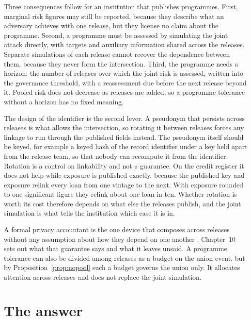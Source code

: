 Three consequences follow for an institution that publishes programmes. First,
marginal risk figures may still be reported, because they describe what an
adversary achieves with one release, but they license no claim about the programme.
Second, a programme must be assessed by simulating the joint attack directly, with
targets and auxiliary information shared across the releases. Separate simulations
of each release cannot recover the dependence between them, because they never form
the intersection. Third, the programme needs a horizon: the number of releases over
which the joint risk is assessed, written into the governance threshold, with a
reassessment due before the next release beyond it. Pooled risk does not decrease as
releases are added, so a programme tolerance without a horizon has no fixed meaning.

The design of the identifier is the second lever. A pseudonym that persists across
releases is what allows the intersection, so rotating it between releases forces any
linkage to run through the published fields instead. The pseudonym itself should be
keyed, for example a keyed hash of the record identifier under a key held apart
from the release team, so that nobody can recompute it from the identifier.
Rotation is a control on linkability and not a guarantee. On the credit register it
does not help while exposure is published exactly, because the published key and
exposure relink every loan from one vintage to the next. With exposure rounded to
one significant figure they relink about one loan in ten. Whether rotation is worth
its cost therefore depends on what else the releases publish, and the joint
simulation is what tells the institution which case it is in.

A formal privacy accountant is the one device that composes across releases without
any assumption about how they depend on one another \citep{dwork2014}. Chapter~10
sets out what that guarantee says and what it leaves unsaid. A programme tolerance
can also be divided among releases as a budget on the union event, but by
Proposition~\ref{prop:nopool} such a budget governs the union only. It allocates
attention across releases and does not replace the joint simulation.

\section{The answer}

